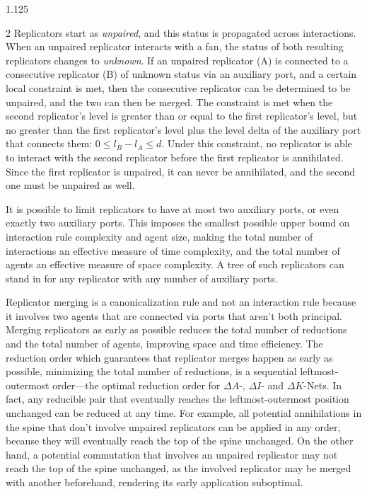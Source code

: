 \documentclass[10pt]{article}
\begin{document}
\begin{spacing}{1.125}
\begin{multicols}{2}
Replicators start as \emph{unpaired}, and this status is propagated across interactions.
When an unpaired replicator interacts with a fan, the status of both resulting replicators changes to \emph{unknown}.
If an unpaired replicator (A) is connected to a consecutive replicator (B) of unknown status via an auxiliary port, and a certain local constraint is met, then the consecutive replicator can be determined to be unpaired, and the two can then be merged.
The constraint is met when the second replicator's level is greater than or equal to the first replicator's level, but no greater than the first replicator's level plus the level delta of the auxiliary port that connects them: \mbox{$0 \le l_B - l_A \le d$}. Under this constraint, no replicator is able to interact with the second replicator before the first replicator is annihilated. Since the first replicator is unpaired, it can never be annihilated, and the second one must be unpaired as well.

It is possible to limit replicators to have at most two auxiliary ports, or even exactly two auxiliary ports. This imposes the smallest possible upper bound on interaction rule complexity and agent size, making the total number of interactions an effective measure of time complexity, and the total number of agents an effective measure of space complexity. A tree of such replicators can stand in for any replicator with any number of auxiliary ports.

Replicator merging is a canonicalization rule and not an interaction rule because it involves two agents that are connected via ports that aren't both principal.
Merging replicators as early as possible reduces the total number of reductions and the total number of agents, improving space and time efficiency.
The reduction order which guarantees that replicator merges happen as early as possible, minimizing the total number of reductions, is a sequential leftmost-outermost order---the optimal reduction order for \mbox{$\Delta A$-}, \mbox{$\Delta I$-} and \mbox{$\Delta K$-Nets}. In fact, any reducible pair that eventually reaches the leftmost-outermost position unchanged can be reduced at any time.
For example, all potential annihilations in the spine that don't involve unpaired replicators can be applied in any order, because they will eventually reach the top of the spine unchanged. On the other hand, a potential commutation that involves an unpaired replicator may not reach the top of the spine unchanged, as the involved replicator may be merged with another beforehand, rendering its early application suboptimal.


\end{multicols}
\end{spacing}
\end{document}
